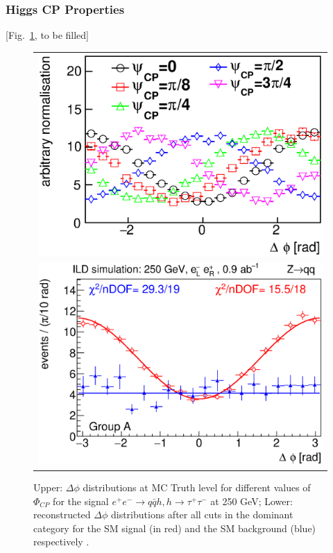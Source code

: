 \subsubsection{Higgs CP Properties}
[Fig.~\ref{fig:qqHtautauCP}, to be filled]
\begin{figure}
\begin{tabular}[c]{c}
\includegraphics[width=0.85\hsize]{chapters/figures/ZH_qqtautau250_CP1.eps} \\
\includegraphics[width=0.85\hsize]{chapters/figures/ZH_qqtautau250_CP2.eps}
\end{tabular}
  \caption{Upper: $\Delta\phi$ distributions at MC Truth level for different 
  values of $\Phi_{CP}$ for the signal $e^+e^-\to q\bar{q} h, h\to\tau^+\tau^-$ at 250 GeV;
  Lower: reconstructed $\Delta\phi$ distributions after all cuts in the dominant category
  for the SM signal (in red) and the SM background (blue) respectively \cite{H2tautauCP}.}
  \label{fig:qqHtautauCP}
\end{figure}


